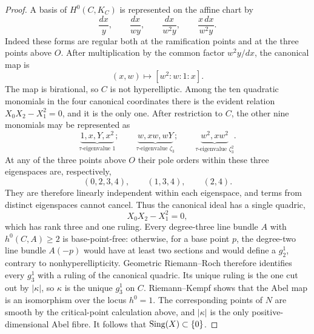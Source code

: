 
\begin{proof}
A basis of $H^0(C,K_C)$ is represented on the affine chart by
\[
 \frac{dx}{y},\qquad
 \frac{dx}{wy},\qquad
 \frac{dx}{w^2y},\qquad
 \frac{x\,dx}{w^2y}.
\]
Indeed these forms are regular both at the ramification points and at the
three points above $O$.  After multiplication by the common factor
$w^2y/dx$, the canonical map is
\[
 (x,w)\longmapsto[w^2:w:1:x].
\]
The map is birational, so $C$ is not hyperelliptic.  Among the ten
quadratic monomials in the four canonical coordinates there is the evident
relation $X_0X_2-X_1^2=0$, and it is the only one.  After restriction to
$C$, the other nine monomials may be represented as
\[
 \underbrace{1,x,Y,x^2}_{\tau\text{-eigenvalue }1};\qquad
 \underbrace{w,xw,wY}_{\tau\text{-eigenvalue }\zeta_3};\qquad
 \underbrace{w^2,xw^2}_{\tau\text{-eigenvalue }\zeta_3^2}.
\]
At any of the three points above $O$ their pole orders within these three
eigenspaces are, respectively,
\[
 (0,2,3,4),\qquad (1,3,4),\qquad (2,4).
\]
They are therefore linearly independent within each eigenspace, and terms
from distinct eigenspaces cannot cancel.  Thus the canonical ideal has a
single quadric,
\[
 X_0X_2-X_1^2=0,
\]
which has rank three and one ruling.  Every degree-three line bundle $A$
with $h^0(C,A)\ge2$ is base-point-free: otherwise, for a base point $p$,
the degree-two line bundle $A(-p)$ would have at least two sections and
would define a $g^1_2$, contrary to nonhyperellipticity.  Geometric
Riemann--Roch therefore identifies every $g^1_3$ with a ruling of the
canonical quadric.  Its unique ruling is the one cut out by $|\kappa|$, so
$\kappa$ is the unique $g^1_3$ on $C$.
Riemann--Kempf \cite{Kempf1973} shows that the Abel map is an isomorphism
over the locus $h^0=1$.  The corresponding points of $N$ are smooth by the
critical-point calculation above, and $|\kappa|$ is the only
positive-dimensional Abel fibre.  It follows that
$\operatorname{Sing}(X)\subset\{0\}$.


\end{proof}
